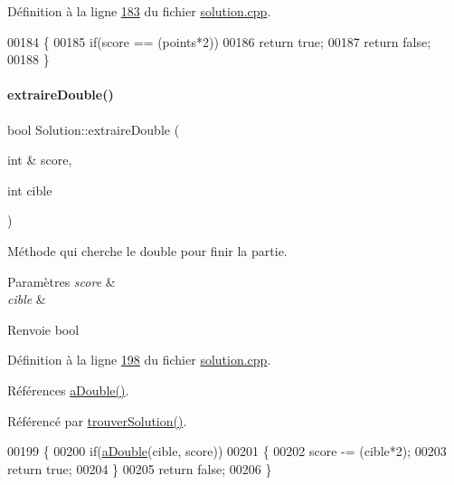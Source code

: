 Définition à la ligne \hyperlink{solution_8cpp_source_l00183}{183} du fichier \hyperlink{solution_8cpp_source}{solution.\+cpp}.


\begin{DoxyCode}
00184 \{
00185     \textcolor{keywordflow}{if}(score == (points*2))
00186         \textcolor{keywordflow}{return} \textcolor{keyword}{true};
00187     \textcolor{keywordflow}{return} \textcolor{keyword}{false};
00188 \}
\end{DoxyCode}
\mbox{\label{class_solution_a34c3bf5ce00cdf428f2e07741806499d}} 
\paragraph{\texorpdfstring{extraire\+Double()}{extraireDouble()}}
{\footnotesize\ttfamily bool Solution\+::extraire\+Double (\begin{DoxyParamCaption}\item[{int \&}]{score,  }\item[{int}]{cible }\end{DoxyParamCaption})\hspace{0.3cm}{\ttfamily [private]}}



Méthode qui cherche le double pour finir la partie. 


\begin{DoxyParams}{Paramètres}
{\em score} & \\
\hline
{\em cible} & \\
\hline
\end{DoxyParams}
\begin{DoxyReturn}{Renvoie}
bool 
\end{DoxyReturn}


Définition à la ligne \hyperlink{solution_8cpp_source_l00198}{198} du fichier \hyperlink{solution_8cpp_source}{solution.\+cpp}.



Références \hyperlink{solution_8cpp_source_l00097}{a\+Double()}.



Référencé par \hyperlink{solution_8cpp_source_l00296}{trouver\+Solution()}.


\begin{DoxyCode}
00199 \{
00200     \textcolor{keywordflow}{if}(\hyperlink{class_solution_ad79929c887a394883a154ea2ca9c3aac}{aDouble}(cible, score))
00201     \{
00202         score -= (cible*2);
00203         \textcolor{keywordflow}{return} \textcolor{keyword}{true};
00204     \}
00205     \textcolor{keywordflow}{return} \textcolor{keyword}{false};
00206 \}
\end{DoxyCode}
\mbox{\label{class_solution_a857b1b362fc0d5eb08e2eb7302dce27f}} 
